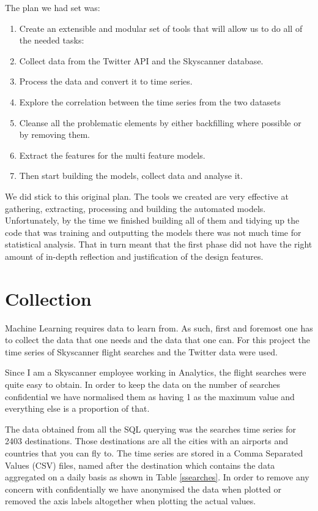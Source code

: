 \documentclass[minf,twoside,singlespacing,parskip,frontabs,notimes,12pt]{infthesis} %
\begin{document}
The plan we had set was:
\begin{enumerate}
\item Create an extensible and modular set of tools that will allow us to do all of the needed tasks:
\item Collect data from the Twitter API and the Skyscanner database. 
\item Process the data and convert it to time series.
\item Explore the correlation between the time series from the two datasets
\item Cleanse all the problematic elements by either backfilling where possible or by removing them.
\item Extract the features for the multi feature models.
\item Then start building the models, collect data and analyse it. 
\end{enumerate}


We did stick to this original plan. The tools we created \cite{code} are very effective at gathering, extracting, processing and building the automated models. Unfortunately, by the time we finished building all of them and tidying up the code that was training and outputting the models there was not much time for statistical analysis. That in turn meant that the first phase did not have the right amount of in-depth reflection and justification of the design features.

\section{Collection}

Machine Learning requires data to learn from. As such, first and foremost one has to collect the data that one needs and the data that one can. For this project the time series of Skyscanner flight searches and the Twitter data were used.

Since I am a Skyscanner employee working in Analytics, the flight searches were quite easy to obtain. In order to keep the data on the number of searches confidential we have normalised them as having 1 as the maximum value and everything else is a proportion of that. 

The data obtained from all the SQL querying was the searches time series for 2403 destinations. Those destinations are all the cities with an airports and countries that you can fly to. The time series are stored in a Comma Separated Values (CSV) files, named after the destination which contains the data aggregated on a daily basis as shown in Table \ref{ssearches}. In order to remove any concern with confidentially we have anonymised the data when plotted or removed the axis labels altogether when plotting the actual values.
\end{document}
